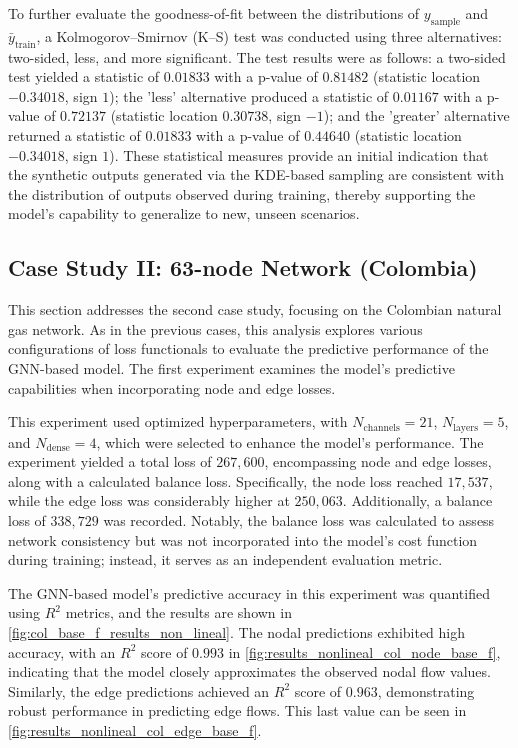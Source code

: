 To further evaluate the goodness-of-fit between the distributions of \( y_{\text{sample}} \) and \( \bar{y}_{\text{train}} \), a Kolmogorov–Smirnov (K–S) test was conducted using three alternatives: two-sided, less, and more significant. The test results were as follows: a two-sided test yielded a statistic of \( 0.01833 \) with a p-value of \( 0.81482 \) (statistic location \(-0.34018\), sign \(1\)); the 'less' alternative produced a statistic of \( 0.01167 \) with a p-value of \( 0.72137 \) (statistic location \(0.30738\), sign \(-1\)); and the 'greater' alternative returned a statistic of \( 0.01833 \) with a p-value of \( 0.44640 \) (statistic location \(-0.34018\), sign \(1\)). These statistical measures provide an initial indication that the synthetic outputs generated via the KDE-based sampling are consistent with the distribution of outputs observed during training, thereby supporting the model's capability to generalize to new, unseen scenarios.


\subsection{Case Study II: 63-node Network (Colombia)}


This section addresses the second case study, focusing on the Colombian natural gas network. As in the previous cases, this analysis explores various configurations of loss functionals to evaluate the predictive performance of the GNN-based model. The first experiment examines the model's predictive capabilities when incorporating node and edge losses.


This experiment used optimized hyperparameters, with \( N_{\text{channels}} = 21 \), \( N_{\text{layers}} = 5 \), and \( N_{\text{dense}} = 4 \), which were selected to enhance the model's performance. The experiment yielded a total loss of \( 267,600 \), encompassing node and edge losses, along with a calculated balance loss. Specifically, the node loss reached \( 17,537 \), while the edge loss was considerably higher at \( 250,063 \). Additionally, a balance loss of \( 338,729 \) was recorded. Notably, the balance loss was calculated to assess network consistency but was not incorporated into the model's cost function during training; instead, it serves as an independent evaluation metric. 

The GNN-based model's predictive accuracy in this experiment was quantified using \( R^2 \) metrics, and the results are shown in \cref{fig:col_base_f_results_non_lineal}. The nodal predictions exhibited high accuracy, with an \( R^2 \) score of \( 0.993 \) in \cref{fig:results_nonlineal_col_node_base_f}, indicating that the model closely approximates the observed nodal flow values. Similarly, the edge predictions achieved an \( R^2 \) score of \( 0.963 \), demonstrating robust performance in predicting edge flows. This last value can be seen in \cref{fig:results_nonlineal_col_edge_base_f}.


